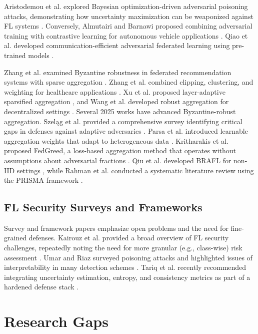 \documentclass[conference]{IEEEtran}
\begin{document}
Aristodemou et al. explored Bayesian optimization-driven adversarial poisoning attacks, demonstrating how uncertainty maximization can be weaponized against FL systems \cite{aristodemou2025maximizing}. Conversely, Almutairi and Barnawi proposed combining adversarial training with contrastive learning for autonomous vehicle applications \cite{almutairi2025enhancing}. Qiao et al. developed communication-efficient adversarial federated learning using pre-trained models \cite{qiao2025communication}.


Zhang et al. examined Byzantine robustness in federated recommendation systems with sparse aggregation \cite{zhang2025rethinking}. Zhang et al. combined clipping, clustering, and weighting for healthcare applications \cite{zhang2025fedccw}. Xu et al. proposed layer-adaptive sparsified aggregation \cite{xu2025achieving}, and Wang et al. developed robust aggregation for decentralized settings \cite{wang2025byzantine_robust}.
Several 2025 works have advanced Byzantine-robust aggregation. Szeląg et al. provided a comprehensive survey identifying critical gaps in defenses against adaptive adversaries \cite{szelag2025adaptive}. Parsa et al. introduced learnable aggregation weights that adapt to heterogeneous data \cite{parsa2025byzantine}. Kritharakis et al. proposed FedGreed, a loss-based aggregation method that operates without assumptions about adversarial fractions \cite{kritharakis2025fedgreed}. Qiu et al. developed BRAFL for non-IID settings \cite{qiu2025brafl}, while Rahman et al. conducted a systematic literature review using the PRISMA framework \cite{rahman2025systematic}.

\subsection{FL Security Surveys and Frameworks}
Survey and framework papers emphasize open problems and the need for fine-grained defenses. Kairouz et al. provided a broad overview of FL security challenges, repeatedly noting the need for more granular (e.g., class-wise) risk assessment \cite{kairouz2024advances}. Umar and Riaz surveyed poisoning attacks and highlighted issues of interpretability in many detection schemes \cite{umar2024survey}. Tariq et al. recently recommended integrating uncertainty estimation, entropy, and consistency metrics as part of a hardened defense stack \cite{tariq2025entropy}.

\section{Research Gaps}
\label{sec:gaps}
\end{document}
